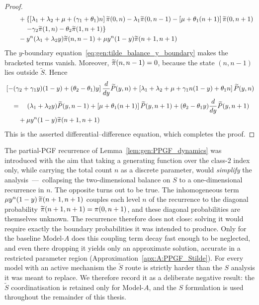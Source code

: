 \begin{proof}
\begin{align*}
\begin{split}
            & \quad \quad + \left\{ \left[ \lambda_1 + \lambda_2 + \mu + (\gamma_1 + \theta_1) n \right] \widetilde{\pi}(0,n) - \lambda_1 \widetilde{\pi}(0,n-1) - \left[ \mu + \theta_1 (n+1) \right] \widetilde{\pi}(0,n+1) \right. \\
            & \quad \quad \quad \left. - \gamma_2 \widetilde{\pi}(1,n) - \theta_2 \widetilde{\pi}(1,n+1) \right\} \\
            & \quad \quad - y^n (\lambda_1 + \lambda_2 y) \widetilde{\pi}(n,n-1) + \mu y^n (1-y) \widetilde{\pi}(n+1,n+1)
        \end{split}
    \end{align*}
    The $y$-boundary equation~\eqref{eq:gen:tilde_balance_y_boundary} makes the bracketed terms vanish. Moreover, $\widetilde{\pi}(n,n-1)=0$, because the state $(n,n-1)$ lies outside $\widetilde{S}$. Hence
    \begin{align*}
        \begin{split}
            & \left[ -(\gamma_2 + \gamma_1 y)(1-y) + (\theta_2 - \theta_1) y \right] \frac{d}{dy} \widetilde{P}(y,n) + \left[ \lambda_1 + \lambda_2 + \mu + \gamma_1 n(1-y) + \theta_1 n \right] \widetilde{P}(y,n) \\
            & \quad = \quad (\lambda_1 + \lambda_2 y) \widetilde{P}(y,n-1) + \left[ \mu + \theta_1 (n+1) \right] \widetilde{P}(y,n+1) + (\theta_2 - \theta_1 y) \frac{d}{dy} \widetilde{P}(y,n+1) \\
            & \quad \quad + \mu y^n (1-y) \widetilde{\pi}(n+1,n+1)
        \end{split}
    \end{align*}
    This is the asserted differential--difference equation, which completes the proof.
\end{proof}

\begin{remark}\label{rem:gen:Stilde_failed}
The partial-PGF recurrence of Lemma~\ref{lem:gen:PPGF_dynamics} was introduced with the
aim that taking a generating function over the class-$2$ index only, while carrying the total
count $n$ as a discrete parameter, would \emph{simplify} the analysis~---~collapsing the
two-dimensional balance on $S$ to a one-dimensional recurrence in $n$. The opposite turns out
to be true. The inhomogeneous term $\mu y^{n}(1-y)\,\widetilde{\pi}(n+1,n+1)$ couples each level $n$ of
the recurrence to the diagonal probability $\widetilde{\pi}(n+1,n+1)=\pi(0,n+1)$, and these diagonal
probabilities are themselves unknown. The recurrence therefore does not close: solving it
would require exactly the boundary probabilities it was intended to produce. Only for the
baseline Model-$A$ does this coupling term decay fast enough to be neglected, and even there
dropping it yields only an approximate solution, accurate in a restricted parameter region
(Approximation~\ref{apx:A:PPGF_Stilde}). For every model with an active mechanism the
$\widetilde{S}$ route is strictly harder than the $S$ analysis it was meant to replace. We
therefore record it as a deliberate negative result: the $\widetilde{S}$ coordinatisation is
retained only for Model-$A$, and the $S$ formulation is used throughout the remainder of this
thesis.
\end{remark}


